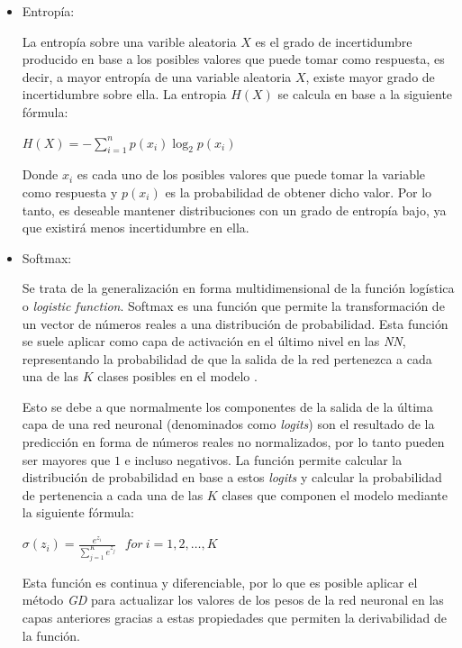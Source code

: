 \begin{itemize}
                \item Entropía:

                    La entropía sobre una varible aleatoria $X$ es el grado de incertidumbre producido en base a los posibles valores que puede tomar como respuesta, es decir, a mayor entropía de una variable aleatoria $X$, existe mayor grado de incertidumbre sobre ella. La entropia $H(X)$ se calcula en base a la siguiente fórmula:

                    \begin{center}
                        $H(X) = -\sum_{i = 1}^n p(x_i) \log_2 p(x_i)$
                    \end{center}

                    Donde $x_i$ es cada uno de los posibles valores que puede tomar la variable como respuesta y $p(x_i)$ es la probabilidad de obtener dicho valor. Por lo tanto, es deseable mantener distribuciones con un grado de entropía bajo, ya que existirá menos incertidumbre en ella.


                \item Softmax:

                    Se trata de la generalización en forma multidimensional de la función logística o \textit{logistic function}. Softmax es una función que permite la transformación de un vector de números reales a una distribución de probabilidad. Esta función se suele aplicar como capa de activación en el último nivel en las \textit{NN}, representando la probabilidad de que la salida de la red pertenezca a cada una de las $K$ clases posibles en el modelo \cite{Softmax}. 

                    Esto se debe a que normalmente los componentes de la salida de la última capa de una red neuronal (denominados como \textit{logits}) son el resultado de la predicción en forma de números reales no normalizados, por lo tanto pueden ser mayores que $1$ e incluso negativos. La función permite calcular la distribución de probabilidad en base a estos \textit{logits} y calcular la probabilidad de pertenencia a cada una de las $K$ clases que componen el modelo mediante la siguiente fórmula:


                    \begin{center}
                        $\sigma(z_i) = \frac{e^{z_{i}}}{\sum_{j=1}^K e^{z_{j}}} \ \ \ for\ i=1,2,\dots,K$
                    \end{center}


                    Esta función es continua y diferenciable, por lo que es posible aplicar el método \textit{GD} para actualizar los valores de los pesos de la red neuronal en las capas anteriores gracias a estas propiedades que permiten la derivabilidad de la función.



\end{itemize}
